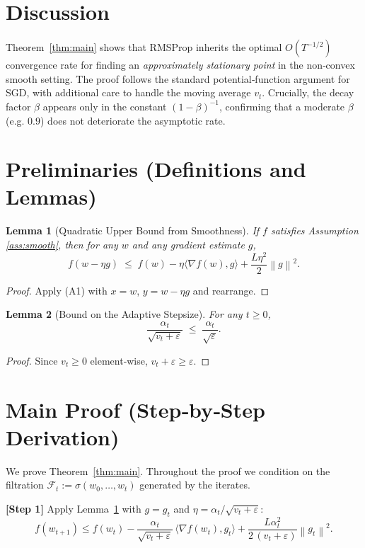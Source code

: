\documentclass{article}
\newtheorem{lemma}{Lemma}
\newcommand{\norm}[1]{\left\lVert#1\right\rVert}
\begin{document}
\section*{Discussion}
Theorem~\ref{thm:main} shows that RMSProp inherits the optimal $O(T^{-1/2})$
convergence rate for finding an \emph{approximately stationary point}
in the non‑convex smooth setting.  The proof follows the standard
potential‑function argument for SGD, with additional care to handle the
moving average $v_t$.  Crucially, the decay factor $\beta$ appears only in the
constant $(1-\beta)^{-1}$, confirming that a moderate $\beta$ (e.g. $0.9$)
does not deteriorate the asymptotic rate.

\newpage
\section*{Preliminaries (Definitions and Lemmas)}
\begin{lemma}[Quadratic Upper Bound from Smoothness]\label{lem:smooth}
If $f$ satisfies Assumption \ref{ass:smooth}, then for any $w$ and any
gradient estimate $g$,
\[
f(w-\eta g)\;\le\; f(w)-\eta\langle\nabla f(w),g\rangle
+\frac{L\eta^2}{2}\norm{g}^2 .
\tag{5}
\]
\end{lemma}
\begin{proof}
Apply (A1) with $x=w$, $y=w-\eta g$ and rearrange.
\end{proof}

\begin{lemma}[Bound on the Adaptive Stepsize]\label{lem:stepsize}
For any $t\ge0$,
\[
\frac{\alpha_t}{\sqrt{v_t+\varepsilon}}
\;\le\;
\frac{\alpha_t}{\sqrt{\varepsilon}} .
\tag{6}
\]
\end{lemma}
\begin{proof}
Since $v_t\ge0$ element‑wise, $v_t+\varepsilon\ge\varepsilon$.
\end{proof}

\section*{Main Proof (Step‑by‑Step Derivation)}
We prove Theorem~\ref{thm:main}.  Throughout the proof we condition on the
filtration $\mathcal{F}_t:=\sigma(w_0,\dots,w_t)$ generated by the iterates.

\bigskip
\noindent\textbf{[Step 1]} Apply Lemma~\ref{lem:smooth} with $g=g_t$ and
$\eta=\alpha_t/\sqrt{v_t+\varepsilon}$:
\[
f(w_{t+1})
\le f(w_t)-\frac{\alpha_t}{\sqrt{v_t+\varepsilon}}\,
\langle\nabla f(w_t),g_t\rangle
+\frac{L\alpha_t^{2}}{2\,(v_t+\varepsilon)}\norm{g_t}^{2}.
\tag{7}
\]
\end{document}
